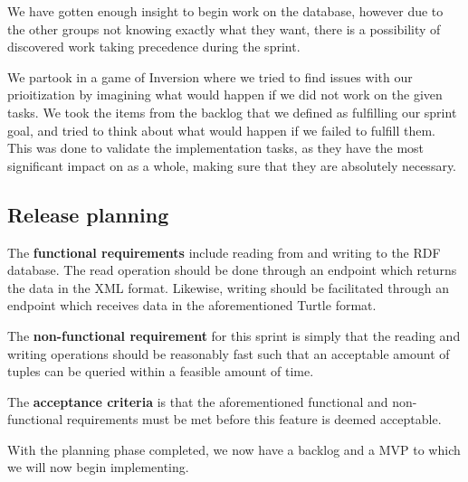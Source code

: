 We have gotten enough insight to begin work on the database, however due to the other groups not knowing exactly what they want, there is a possibility of discovered work taking precedence during the sprint.

We partook in a game of Inversion \cite{InversionThinking} where we tried to find issues with our prioitization by imagining what would happen if we did not work on the given tasks.
We took the items from the backlog that we defined as fulfilling our sprint goal, and tried to think about what would happen if we failed to fulfill them. 
This was done to validate the implementation tasks, as they have the most significant impact on \knox{} as a whole, making sure that they are absolutely necessary. 

\subsection*{Release planning}\label{acceptCriteriaSprint5}
The \textbf{functional requirements} include reading from and writing to the RDF database. 
The read operation should be done through an endpoint which returns the data in the XML format.
Likewise, writing should be facilitated through an endpoint which receives data in the aforementioned Turtle format.


The \textbf{non-functional requirement} for this sprint is simply that the reading and writing operations should be reasonably fast such that an acceptable amount of tuples can be queried within a feasible amount of time.


The \textbf{acceptance criteria} is that the aforementioned functional and non-functional requirements must be met before this feature is deemed acceptable. 


With the planning phase completed, we now have a backlog and a MVP to which we will now begin implementing.